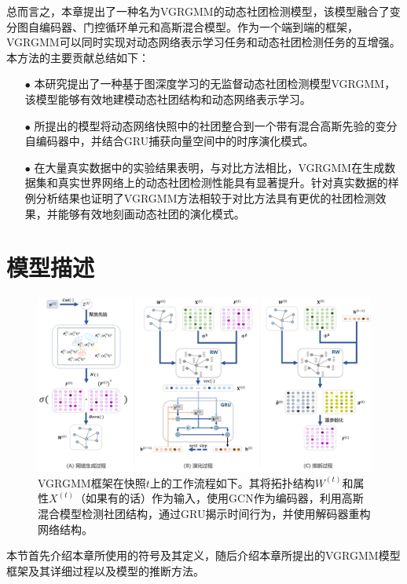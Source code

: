 总而言之，本章提出了一种名为VGRGMM的动态社团检测模型，该模型融合了变分图自编码器、门控循环单元和高斯混合模型。作为一个端到端的框架，VGRGMM可以同时实现对动态网络表示学习任务和动态社团检测任务的互增强。本方法的主要贡献总结如下：
\begin{itemize}
    \item[$\bullet$] 本研究提出了一种基于图深度学习的无监督动态社团检测模型VGRGMM，该模型能够有效地建模动态社团结构和动态网络表示学习。
    \item[$\bullet$] 所提出的模型将动态网络快照中的社团整合到一个带有混合高斯先验的变分自编码器中，并结合GRU捕获向量空间中的时序演化模式。
    \item[$\bullet$] 在大量真实数据中的实验结果表明，与对比方法相比，VGRGMM在生成数据集和真实世界网络上的动态社团检测性能具有显著提升。针对真实数据的样例分析结果也证明了VGRGMM方法相较于对比方法具有更优的社团检测效果，并能够有效地刻画动态社团的演化模式。
\end{itemize}


\section{模型描述\label{chap6:model}}

\begin{figure}
\centering 
\includegraphics[width=\textwidth]{figures/chap06/VGRGMM.png}
\caption{VGRGMM框架在快照$t$上的工作流程如下。其将拓扑结构$W^{(t)}$和属性$X^{(t)}$（如果有的话）作为输入，使用GCN作为编码器，利用高斯混合模型检测社团结构，通过GRU揭示时间行为，并使用解码器重构网络结构。
} 
\label{fig1}
\end{figure}


本节首先介绍本章所使用的符号及其定义，随后介绍本章所提出的VGRGMM模型框架及其详细过程以及模型的推断方法。

